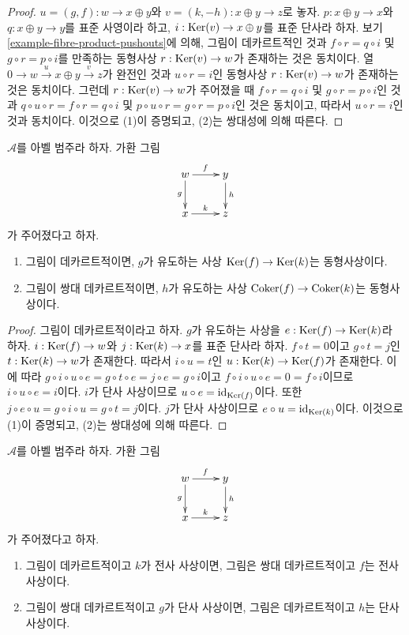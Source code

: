 \begin{proof}
$u = (g, f) : w \to x \oplus y$와
$v = (k, -h) : x \oplus y \to z$로 놓자.
$p : x \oplus y \to x$와 $q : x \oplus y \to y$를 표준 사영이라 하고,
$i : \mathop{\mathrm{Ker}}(v) \to x \oplus y$를 표준 단사라 하자.
보기 \ref{example-fibre-product-pushouts}에 의해, 그림이 데카르트적인 것과
$f \circ r = q \circ i$ 및 $g \circ r = p \circ i$를 만족하는 동형사상
$r : \mathop{\mathrm{Ker}}(v) \to w$가 존재하는 것은 동치이다.
열 $0 \to w \overset{u} \to x \oplus y \overset{v} \to z$가 완전인 것과
$u \circ r = i$인 동형사상 $r : \mathop{\mathrm{Ker}}(v) \to w$가 존재하는 것은 동치이다.
그런데 $r : \mathop{\mathrm{Ker}}(v) \to w$가 주어졌을 때
$f \circ r = q \circ i$ 및 $g \circ r = p \circ i$인 것과
$q \circ u \circ r= f \circ r = q \circ i$ 및
$p \circ u \circ r = g \circ r = p \circ i$인 것은 동치이고, 따라서
$u \circ r = i$인 것과 동치이다. 이것으로 (1)이 증명되고, (2)는
쌍대성에 의해 따른다.
\end{proof}

\begin{lemma}
\label{lemma-cartesian-kernel}
$\mathcal{A}$를 아벨 범주라 하자. 가환 그림
$$
\xymatrix{
w\ar[r]^f\ar[d]_g
& y\ar[d]^h\\
x\ar[r]^k
& z
}
$$
가 주어졌다고 하자.
\begin{enumerate}
\item 그림이 데카르트적이면, $g$가 유도하는 사상
$\mathop{\mathrm{Ker}}(f)\to\mathop{\mathrm{Ker}}(k)$는 동형사상이다.
\item 그림이 쌍대 데카르트적이면, $h$가 유도하는 사상
$\mathop{\mathrm{Coker}}(f)\to\mathop{\mathrm{Coker}}(k)$는 동형사상이다.
\end{enumerate}
\end{lemma}

\begin{proof}
그림이 데카르트적이라고 하자. $g$가 유도하는 사상을
$e:\mathop{\mathrm{Ker}}(f)\to\mathop{\mathrm{Ker}}(k)$라 하자. $i:\mathop{\mathrm{Ker}}(f)\to w$와
$j:\mathop{\mathrm{Ker}}(k)\to x$를 표준 단사라 하자. $f\circ t=0$이고
$g\circ t=j$인 $t:\mathop{\mathrm{Ker}}(k)\to w$가 존재한다. 따라서
$i\circ u=t$인 $u:\mathop{\mathrm{Ker}}(k)\to\mathop{\mathrm{Ker}}(f)$가 존재한다. 이에 따라
$g\circ i\circ u\circ e=g\circ t\circ e=j\circ e=g\circ i$이고
$f\circ i\circ u\circ e=0=f\circ i$이므로 $i\circ u\circ e=i$이다.
$i$가 단사 사상이므로 $u\circ e=\text{id}_{\mathop{\mathrm{Ker}}(f)}$이다.
또한 $j\circ e\circ u=g\circ i\circ u=g\circ t=j$이다.
$j$가 단사 사상이므로 $e\circ u=\text{id}_{\mathop{\mathrm{Ker}}(k)}$이다.
이것으로 (1)이 증명되고, (2)는 쌍대성에 의해 따른다.
\end{proof}

\begin{lemma}
\label{lemma-cartesian-cocartesian}
$\mathcal{A}$를 아벨 범주라 하자. 가환 그림
$$
\xymatrix{
w\ar[r]^f\ar[d]_g
& y\ar[d]^h\\
x\ar[r]^k
& z
}
$$
가 주어졌다고 하자.
\begin{enumerate}
\item 그림이 데카르트적이고 $k$가 전사 사상이면, 그림은 쌍대
데카르트적이고 $f$는 전사 사상이다.
\item 그림이 쌍대 데카르트적이고 $g$가 단사 사상이면, 그림은
데카르트적이고 $h$는 단사 사상이다.
\end{enumerate}
\end{lemma}

